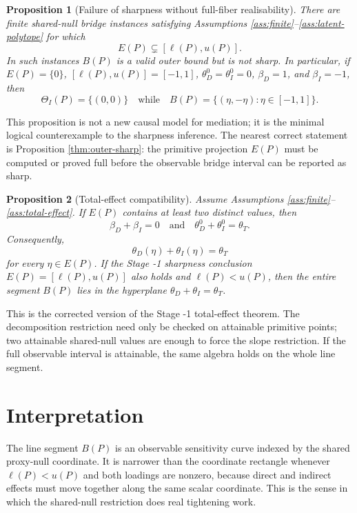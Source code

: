 \documentclass[11pt]{article}
\theoremstyle{definition}
\theoremstyle{plain}
\newtheorem{proposition}{Proposition}
\theoremstyle{remark}
\begin{document}
\begin{proposition}[Failure of sharpness without full-fiber realisability]\label{thm:sharp-fails}
There are finite shared-null bridge instances satisfying Assumptions
\ref{ass:finite}--\ref{ass:latent-polytope} for which
\[
  E(P)\subsetneq[\ell(P),u(P)].
\]
In such instances \(B(P)\) is a valid outer bound but is not sharp.  In
particular, if \(E(P)=\{0\}\), \([\ell(P),u(P)]=[-1,1]\),
\(\theta_D^0=\theta_I^0=0\), \(\beta_D=1\), and \(\beta_I=-1\), then
\[
  \Theta_I(P)=\{(0,0)\}
  \quad\text{while}\quad
  B(P)=\{(\eta,-\eta):\eta\in[-1,1]\}.
\]
\end{proposition}

This proposition is not a new causal model for mediation; it is the minimal
logical counterexample to the sharpness inference.  The nearest correct
statement is Proposition \ref{thm:outer-sharp}: the primitive projection \(E(P)\)
must be computed or proved full before the observable bridge interval can be
reported as sharp.

\begin{proposition}[Total-effect compatibility]\label{thm:total-effect}
Assume Assumptions \ref{ass:finite}--\ref{ass:total-effect}.  If \(E(P)\)
contains at least two distinct values, then
\[
  \beta_D+\beta_I=0
  \quad\text{and}\quad
  \theta_D^0+\theta_I^0=\theta_T.
\]
Consequently,
\[
  \theta_D(\eta)+\theta_I(\eta)=\theta_T
\]
for every \(\eta\in E(P)\).  If the Stage -1 sharpness conclusion
\(E(P)=[\ell(P),u(P)]\) also holds and \(\ell(P)<u(P)\), then the entire
segment \(B(P)\) lies in the hyperplane \(\theta_D+\theta_I=\theta_T\).
\end{proposition}

This is the corrected version of the Stage -1 total-effect theorem.  The
decomposition restriction need only be checked on attainable primitive points;
two attainable shared-null values are enough to force the slope restriction.
If the full observable interval is attainable, the same algebra holds on the
whole line segment.

\section{Interpretation}
The line segment \(B(P)\) is an observable sensitivity curve indexed by the
shared proxy-null coordinate.  It is narrower than the coordinate rectangle
whenever \(\ell(P)<u(P)\) and both loadings are nonzero, because direct and
indirect effects must move together along the same scalar coordinate.  This is
the sense in which the shared-null restriction does real tightening work.
\end{document}
